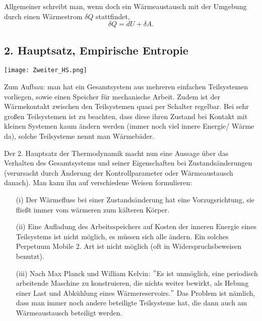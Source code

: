 \documentclass[../KlassMech_main.tex]{subfiles}
\begin{document}
Allgemeiner schreibt man, wenn doch ein Wärmeaustausch mit der Umgebung durch einen Wärmestrom $\delta Q$ stattfindet,
\begin{equation}
\delta Q = dU + \delta A .
\end{equation}




	\subsection{2. Hauptsatz, Empirische Entropie}
\begin{center}
\texttt{[image: Zweiter\_HS.png]}
\label{fig:Zweiter_HS}
\end{center}
Zum Aufbau: man hat ein Gesamtsystem aus mehreren einfachen Teilsystemen vorliegen, sowie einen Speicher für mechanische Arbeit. Zudem ist der Wärmekontakt zwischen den Teilsystemen quasi per Schalter regelbar. Bei sehr großen Teilsystemen ist zu beachten, dass diese ihren Zustand bei Kontakt mit kleinen Systemen kaum ändern werden (immer noch viel innere Energie/ Wärme da), solche Teilsysteme nennt man Wärmebäder.


Der 2. Hauptsatz der Thermodynamik macht nun eine Aussage über das Verhalten des Gesamtsystems und seiner Eigenschaften bei Zustandsänderungen (verursacht durch Änderung der Kontrollparameter oder Wärmeaustausch danach). Man kann ihn auf verschiedene Weisen formulieren:

\begin{itemize}
\item[(i)] Der Wärmefluss bei einer Zustandsänderung hat eine Vorzugsrichtung, sie fließt immer vom wärmeren zum kälteren Körper.

\item[(ii)] Eine Aufladung des Arbeitsspeichers auf Kosten der inneren Energie eines Teilsystems ist nicht möglich, es müssen sich alle ändern. Ein solches Perpetuum Mobile 2. Art ist nicht möglich (oft in Widerspruchsbeweisen benutzt).

\item[(iii)] Nach Max Planck und William Kelvin: $"$Es ist unmöglich, eine periodisch arbeitende Maschine zu konstruieren, die nichts weiter bewirkt, als Hebung einer Last und Abkühlung eines Wärmereservoirs.$"$ Das Problem ist nämlich, dass man immer noch andere beteiligte Teilsysteme hat, die dann auch am Wärmeaustausch beteiligt werden.
\end{itemize}
\end{document}
